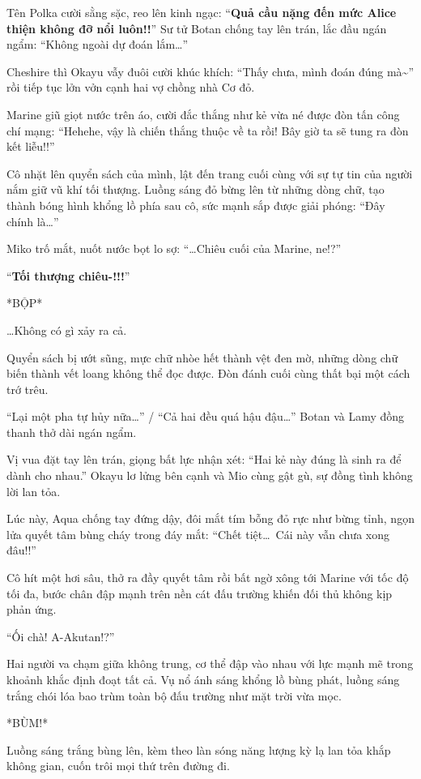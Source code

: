 \documentclass[../main.tex]{subfiles}
\begin{document}
Tên Polka cười sằng sặc, reo lên kinh ngạc: ``\textbf{Quả cầu nặng đến mức Alice thiện không đỡ nổi luôn!!}'' Sư tử Botan chống tay lên trán, lắc đầu ngán ngẩm: ``Không ngoài dự đoán lắm\dots''

Cheshire thì Okayu vẫy đuôi cười khúc khích: ``Thấy chưa, mình đoán đúng mà\~{}'' rồi tiếp tục lởn vởn cạnh hai vợ chồng nhà Cơ đỏ.

Marine giũ giọt nước trên áo, cười đắc thắng như kẻ vừa né được đòn tấn công chí mạng: ``Hehehe, vậy là chiến thắng thuộc về ta rồi! Bây giờ ta sẽ tung ra đòn kết liễu!!''

Cô nhặt lên quyển sách của mình, lật đến trang cuối cùng với sự tự tin của người nắm giữ vũ khí tối thượng. Luồng sáng đỏ bừng lên từ những dòng chữ, tạo thành bóng hình khổng lồ phía sau cô, sức mạnh sắp được giải phóng: ``Đây chính là\dots''

Miko trố mắt, nuốt nước bọt lo sợ: ``\dots  Chiêu cuối của Marine, ne!?''

``\textbf{Tối thượng chiêu-!!!}''

*BỘP*

\dots Không có gì xảy ra cả.

Quyển sách bị ướt sũng, mực chữ nhòe hết thành vệt đen mờ, những dòng chữ biến thành vết loang không thể đọc được. Đòn đánh cuối cùng thất bại một cách trớ trêu.

``Lại một pha tự hủy nữa\dots'' / ``Cả hai đều quá hậu đậu\dots'' Botan và Lamy đồng thanh thở dài ngán ngẩm.

Vị vua đặt tay lên trán, giọng bất lực nhận xét: ``Hai kẻ này đúng là sinh ra để dành cho nhau.'' Okayu lơ lửng bên cạnh và Mio cùng gật gù, sự đồng tình không lời lan tỏa.

Lúc này, Aqua chống tay đứng dậy, đôi mắt tím bỗng đỏ rực như bừng tỉnh, ngọn lửa quyết tâm bùng cháy trong đáy mắt: ``Chết tiệt\dots\ Cái này vẫn chưa xong đâu!!''

Cô hít một hơi sâu, thở ra đầy quyết tâm rồi bất ngờ xông tới Marine với tốc độ tối đa, bước chân đập mạnh trên nền cát đấu trường khiến đối thủ không kịp phản ứng.

``Ối chà! A-Akutan!?''

Hai người va chạm giữa không trung, cơ thể đập vào nhau với lực mạnh mẽ trong khoảnh khắc định đoạt tất cả. Vụ nổ ánh sáng khổng lồ bùng phát, luồng sáng trắng chói lóa bao trùm toàn bộ đấu trường như mặt trời vừa mọc.

*BÙM!*

Luồng sáng trắng bùng lên, kèm theo làn sóng năng lượng kỳ lạ lan tỏa khắp không gian, cuốn trôi mọi thứ trên đường đi.
\end{document}
